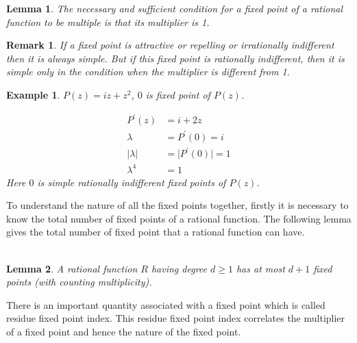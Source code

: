 \documentclass[a4paper,12pt,reqno]{amsart}
\newtheorem{example}{Example}
\newtheorem{lemma}{Lemma}
\newtheorem*{remark}{Remark}
\begin{document}
\begin{lemma}\cite{The real non-attractive fixed point conjecture and beyond} The necessary and sufficient condition for a fixed point of a rational function to be multiple is that its multiplier is 1.
 \end{lemma}


\begin{remark}
    
     If a fixed point is attractive or repelling or irrationally indifferent then it is always simple. But if this fixed point is rationally indifferent, then it is simple only in the condition when the multiplier is different from 1.
\end{remark}

\begin{example}
    
$P(z)=iz+z^{2}$, $0$ is fixed point of $P(z)$.

\begin{align*}
P^{\prime}(z)&=i+2z\\
\lambda&=P^{\prime}(0)=i\\
\vert\lambda\vert&=\vert P^{\prime}(0)\vert=1\\
\lambda^{4}&=1
\end{align*}
Here $0$ is simple rationally indifferent fixed points of $P(z)$.\\

\end{example}
To understand the nature of all the fixed points together, firstly it is
necessary to know the total number of fixed points of a rational
function. The following lemma gives the total number of fixed point that a rational function can have.
 ${}$\\ ${}$\\
\begin{lemma}
    
\cite{Iteration of rational functions: Complex analytic dynamical systems} A rational function $R$ having degree $d\geq 1$ has at most $d+1$ fixed points (with counting multiplicity).
\end{lemma}

 There is an important quantity associated with a fixed point which is called residue fixed point index. This residue fixed point index correlates the multiplier of a fixed point and hence the nature of the fixed point. 
 
\end{document}
